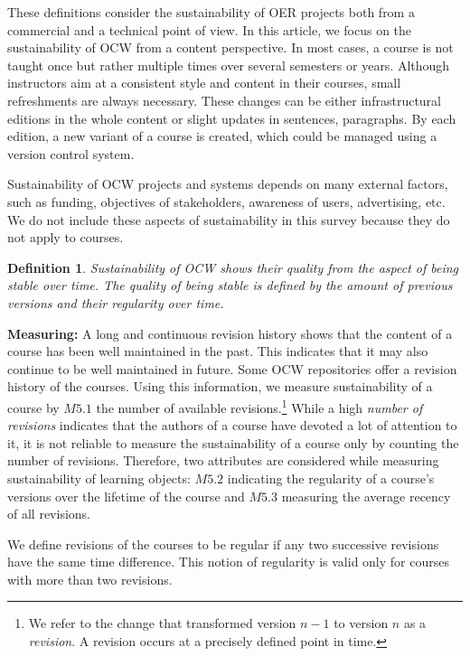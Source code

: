 \documentclass{sig-alternate}
\theoremstyle{definition}
\newtheorem{defn}{Definition}
\begin{document}
These definitions consider the sustainability of OER projects both from a commercial and a technical point of view.
In this article, we focus on the sustainability of OCW from a content perspective.
In most cases, a course is not taught once but rather multiple times over several semesters or years.
Although instructors aim at a consistent style and content in their courses, small refreshments are always necessary.
These changes can be either infrastructural editions in the whole content or slight updates in sentences, paragraphs.
By each edition, a new variant of a course is created, which could be managed using a version control system.

Sustainability of OCW projects and systems depends on many external factors, such as funding, objectives of stakeholders, awareness of users, advertising, etc.
We do not include these aspects of sustainability in this survey because they do not apply to courses.

\begin{defn}
\emph {Sustainability of OCW shows their quality from the aspect of being stable over time.
The quality of being stable is defined by the amount of previous versions and their regularity over time.}
\end{defn}

\noindent\textbf{Measuring:}
A long and continuous revision history shows that the content of a course has been well maintained in the past.
This indicates that it may also continue to be well maintained in future.
Some OCW repositories offer a revision history of the courses.
Using this information, we measure sustainability of a course by $M5.1$ the number of available revisions.\footnote{We refer to the change that transformed version $n-1$ to version $n$ as a \emph{revision}. A revision occurs at a precisely defined point in time.}
While a high \emph{number of revisions} indicates that the authors of a course have devoted a lot of attention to it, it is not reliable to measure the sustainability of a course only by counting the number of revisions.
Therefore, two attributes are considered while measuring sustainability of learning objects:
$M5.2$ indicating the regularity of a course's versions over the lifetime of the course and
$M5.3$ measuring the average recency of all revisions.

We define revisions of the courses to be regular if any two successive revisions have the same time difference.
This notion of regularity is valid only for courses with more than two revisions.
\end{document}
